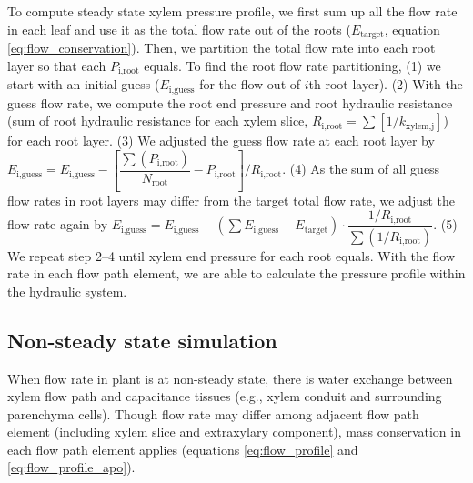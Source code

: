 \documentclass[twoside,10pt]{report}
\begin{document}
\par To compute steady state xylem pressure profile, we first sum up all the flow rate in each leaf and use it as the total flow rate out of the roots ($E_\text{target}$, equation \ref{eq:flow_conservation}). Then, we partition the total flow rate into each root layer so that each $P_\text{i,root}$ equals. To find the root flow rate partitioning, (1) we start with an initial guess ($E_\text{i,guess}$ for the flow out of $i$th root layer). (2) With the guess flow rate, we compute the root end pressure and root hydraulic resistance (sum of root hydraulic resistance for each xylem slice, $R_\text{i,root} = \sum \left[ 1 / k_\text{xylem,j} \right]$) for each root layer. (3) We adjusted the guess flow rate at each root layer by $E_\text{i,guess} = E_\text{i,guess} - \left[ \dfrac{\sum \left( P_\text{i,root} \right)}{N_\text{root}} - P_\text{i,root} \right] / R_\text{i,root}$. (4) As the sum of all guess flow rates in root layers may differ from the target total flow rate, we adjust the flow rate again by $E_\text{i,guess} = E_\text{i,guess} - \left( \sum E_\text{i,guess} - E_\text{target} \right) \cdot \dfrac{1 / R_\text{i,root}}{\sum \left( 1 / R_\text{i,root} \right)}$. (5) We repeat step 2--4 until xylem end pressure for each root equals. With the flow rate in each flow path element, we are able to calculate the pressure profile within the hydraulic system.




\subsection{Non-steady state simulation}
\par When flow rate in plant is at non-steady state, there is water exchange between xylem flow path and capacitance tissues (e.g., xylem conduit and surrounding parenchyma cells). Though flow rate may differ among adjacent flow path element (including xylem slice and extraxylary component), mass conservation in each flow path element applies (equations \ref{eq:flow_profile} and \ref{eq:flow_profile_apo}).
\end{document}
